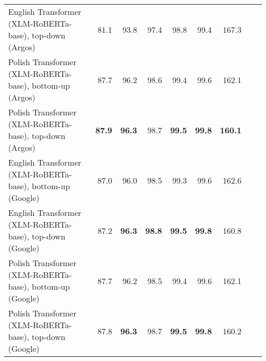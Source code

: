 \begin{table}[ht!]
{\begin{tabular}{lrrrrrrrr}
  English Transformer (XLM-RoBERTa-base), top-down (Argos) & 81.1 & 93.8 & 97.4 & 98.8 & 99.4 & 167.3 \\ 
  Polish Transformer (XLM-RoBERTa-base), bottom-up (Argos) & 87.7 & 96.2 & 98.6 & 99.4 & 99.6 & 162.1 \\ 
  Polish Transformer (XLM-RoBERTa-base), top-down (Argos) & \textbf{87.9} & \textbf{96.3} & 98.7 & \textbf{99.5} & \textbf{99.8} & \textbf{160.1} \\ 
  English Transformer (XLM-RoBERTa-base), bottom-up (Google) & 87.0 & 96.0 & 98.5 & 99.3 & 99.6 & 162.6 \\ 
  English Transformer (XLM-RoBERTa-base), top-down (Google) & 87.2 & \textbf{96.3} & \textbf{98.8} & \textbf{99.5} & \textbf{99.8} & 160.8 \\ 
  Polish Transformer (XLM-RoBERTa-base), bottom-up (Google) & 87.7 & 96.2 & 98.5 & 99.4 & 99.6 & 162.1 \\ 
  Polish Transformer (XLM-RoBERTa-base), top-down (Google) & 87.8 & \textbf{96.3} & 98.7 & \textbf{99.5} & \textbf{99.8} & 160.2 \\ 
   \hline
\end{tabular}
}
\end{table}




